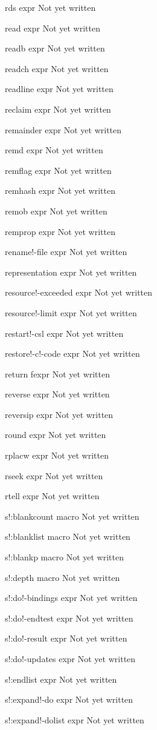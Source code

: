 \documentclass[a4paper,11pt]{article}
\begin{document}
\begin{description}
rds expr
Not yet written

read expr
Not yet written

readb expr
Not yet written

readch expr
Not yet written

readline expr
Not yet written

reclaim expr
Not yet written

remainder expr
Not yet written

remd expr
Not yet written

remflag expr
Not yet written

remhash expr
Not yet written

remob expr
Not yet written

remprop expr
Not yet written

rename!-file expr
Not yet written

representation expr
Not yet written

resource!-exceeded expr
Not yet written

resource!-limit expr
Not yet written

restart!-csl expr
Not yet written

restore!-c!-code expr
Not yet written

return fexpr
Not yet written

reverse expr
Not yet written

reversip expr
Not yet written

round expr
Not yet written

rplacw expr
Not yet written

rseek expr
Not yet written

rtell expr
Not yet written

s!:blankcount macro
Not yet written

s!:blanklist macro
Not yet written

s!:blankp macro
Not yet written

s!:depth macro
Not yet written

s!:do!-bindings expr
Not yet written

s!:do!-endtest expr
Not yet written

s!:do!-result expr
Not yet written

s!:do!-updates expr
Not yet written

s!:endlist expr
Not yet written

s!:expand!-do expr
Not yet written

s!:expand!-dolist expr
Not yet written


\end{description}
\end{document}
